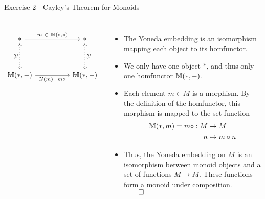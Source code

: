 \begin{frame}[fragile]{Exercise 2 - Cayley's Theorem for Monoids}
	\begin{columns}
		\[\begin{tikzcd}
			* && * \\
			\\
			{\bM(*, -)} && {\bM(*,-)}
			\arrow["{m\ \in\ \bM(*,*)}", from=1-1, to=1-3]
			\arrow["{\mathcal{Y}}"', dotted, leftrightarrow, from=1-1, to=3-1]
			\arrow["{\mathcal{Y}}", dotted, leftrightarrow, from=1-3, to=3-3]
			\arrow["{\mathcal{Y}(m) = m \circ}"', from=3-1, to=3-3]
		\end{tikzcd}\]
		\begin{itemize}
			\item The Yoneda embedding is an isomorphism mapping each object to its homfunctor.
			\pause\item We only have one object $*$, and thus only one homfunctor $\mathbb{M}(*, -)$.
			\pause\item Each element $m \in M$ is a morphism. By the definition of the homfunctor, this morphism is mapped to the set function 
			\begin{align*}
				\mathbb{M}(*, m) = m \circ : M &\to M\\
				n &\mapsto m \circ n
			\end{align*}
			\vspace{-20pt}\pause\item Thus, the Yoneda embedding on $M$ is an isomorphism between monoid objects and a set of functions $M \to M$. These functions form a monoid under composition.\\\hfill $\qed$ 
		\end{itemize}
	\end{columns}
\end{frame}
